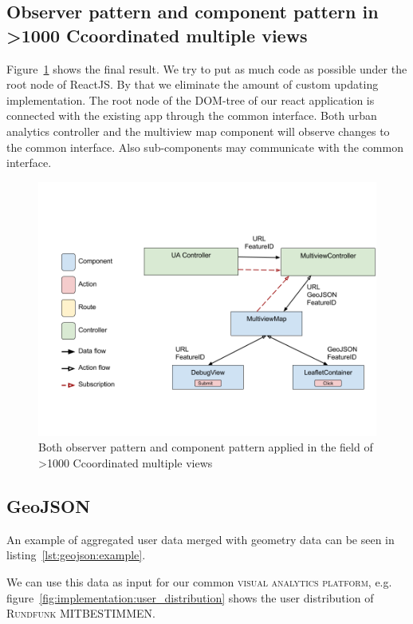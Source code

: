 \documentclass{article}
\newcommand{\rufu}{\textsc{Rundfunk MITBESTIMMEN}}
\newcommand{\visan}{\textsc{visual analytics platform}}
\newcommand\hmm[1]{\ifnum\ifhmode\spacefactor\else2000\fi>1000 \uppercase{#1}\else#1\fi}
\newcommand{\cmvs}{\hmm{c}oordinated multiple views}
\begin{document}
\subsection{Observer pattern and component pattern in \cmvs{}}
Figure~\ref{fig:implementation:both-patterns} shows the final result.
We try to put as much code as possible under the root node of ReactJS.
By that we eliminate the amount of custom updating implementation.
The root node of the DOM-tree of our react application is connected with the existing app through the common interface.
Both urban analytics controller and the multiview map component will observe changes to the common interface. 
Also sub-components may communicate with the common interface.


\begin{figure}[h!]
  \centering
  \includegraphics[width=\textwidth]{images/both-patterns-implemented.png}
  \caption{Both observer pattern and component pattern applied in the field of \cmvs{}}
  \label{fig:implementation:both-patterns}
\end{figure}


\subsection{GeoJSON}

An example of aggregated user data merged with geometry data can be seen in listing~\ref{lst:geojson:example}.


We can use this data as input for our common \visan{}, e.g. figure~\ref{fig:implementation:user_distribution} shows the user distribution of \rufu{}.
\end{document}
